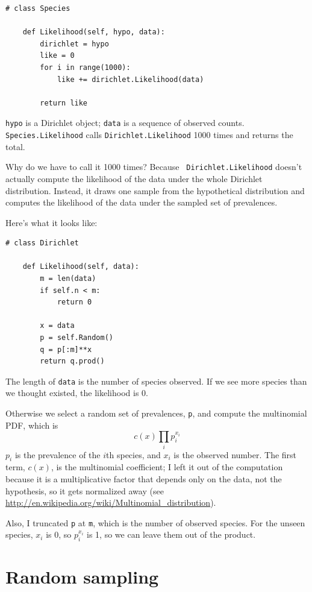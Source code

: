 \documentclass[12pt]{book}
\begin{document}
\begin{verbatim}
# class Species

    def Likelihood(self, hypo, data):
        dirichlet = hypo
        like = 0
        for i in range(1000):
            like += dirichlet.Likelihood(data)

        return like
\end{verbatim}

{\tt hypo} is a Dirichlet object; {\tt data} is a sequence of
observed counts.  {\tt Species.Likelihood} calls
{\tt Dirichlet.Likelihood} 1000 times and returns the total.

Why do we have to call it 1000 times?  Because {\tt
  Dirichlet.Likelihood} doesn't actually compute the likelihood of the
data under the whole Dirichlet distribution.  Instead, it draws one
sample from the hypothetical distribution and computes the likelihood
of the data under the sampled set of prevalences.

Here's what it looks like:

\begin{verbatim}
# class Dirichlet

    def Likelihood(self, data):
        m = len(data)
        if self.n < m:
            return 0

        x = data
        p = self.Random()
        q = p[:m]**x
        return q.prod()
\end{verbatim}

The length of {\tt data} is the number of species observed.  If
we see more species than we thought existed, the likelihood is 0.

Otherwise we select a random set of prevalences, {\tt p}, and
compute the multinomial PDF, which is
%
\[ c(x) \prod_i p_i^{x_i}\]
%
$p_i$ is the prevalence of the $i$th species, and $x_i$ is the
observed number.  The first term, $c(x)$, is the multinomial
coefficient; I left it out of the computation because it is
a multiplicative factor that depends only
on the data, not the hypothesis, so it gets normalized away
(see \url{http://en.wikipedia.org/wiki/Multinomial_distribution}).

Also, I truncated {\tt p} at {\tt m}, which is the number of
observed species.  For the unseen species, $x_i$ is 0, so
$p_i^{x_i}$ is 1, so we can leave them out of the product.


\section{Random sampling}
\end{document}
